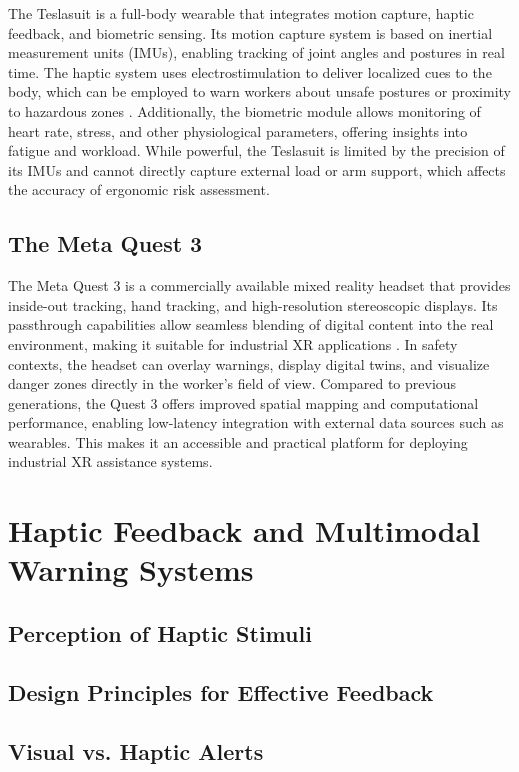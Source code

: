 The Teslasuit is a full-body wearable that integrates motion capture, haptic feedback,
and biometric sensing. Its motion capture system is based on inertial measurement
units (IMUs), enabling tracking of joint angles and postures in real time. The haptic
system uses electrostimulation to deliver localized cues to
the body, which can be employed to warn workers about unsafe postures or proximity
to hazardous zones \cite{teslasuitwhitepaper}. Additionally, the biometric module allows
monitoring of heart rate, stress, and other physiological parameters, offering insights
into fatigue and workload. While powerful, the Teslasuit is limited by the precision of
its IMUs and cannot directly capture external load or arm support, which affects the
accuracy of ergonomic risk assessment.

\subsection{The Meta Quest 3}

The Meta Quest 3 is a commercially available mixed reality headset that provides
inside-out tracking, hand tracking, and high-resolution stereoscopic displays.
Its passthrough capabilities allow seamless blending of digital content into the
real environment, making it suitable for industrial XR applications \cite{metaquest2023}. 
In safety contexts, the headset can overlay warnings, display digital twins, and 
visualize danger zones directly in the worker’s field of view. Compared to previous 
generations, the Quest 3 offers improved spatial mapping and computational 
performance, enabling low-latency integration with external data sources such 
as wearables. This makes it an accessible and practical platform for deploying 
industrial XR assistance systems.

\section{Haptic Feedback and Multimodal Warning Systems}
\subsection{Perception of Haptic Stimuli}

\subsection{Design Principles for Effective Feedback}

\subsection{Visual vs. Haptic Alerts}

